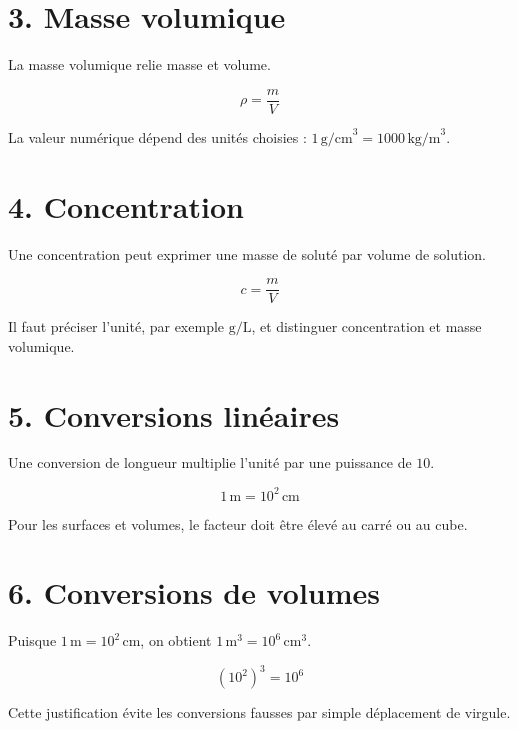 \section{3. Masse volumique}
La masse volumique relie masse et volume.

\[
\rho=\dfrac mV
\]

\begin{exemple}
La valeur numérique dépend des unités choisies : $1\,\text{g/cm}^3=1000\,\text{kg/m}^3$.
\end{exemple}

\section{4. Concentration}
Une concentration peut exprimer une masse de soluté par volume de solution.

\[
c=\dfrac mV
\]

\begin{exemple}
Il faut préciser l’unité, par exemple $\text{g/L}$, et distinguer concentration et masse volumique.
\end{exemple}

\section{5. Conversions linéaires}
Une conversion de longueur multiplie l’unité par une puissance de $10$.

\[
1\,\text{m}=10^2\,\text{cm}
\]

\begin{exemple}
Pour les surfaces et volumes, le facteur doit être élevé au carré ou au cube.
\end{exemple}


\section{6. Conversions de volumes}
Puisque $1\,\text{m}=10^2\,\text{cm}$, on obtient $1\,\text{m}^3=10^6\,\text{cm}^3$.

\[
(10^2)^3=10^6
\]

\begin{exemple}
Cette justification évite les conversions fausses par simple déplacement de virgule.
\end{exemple}

